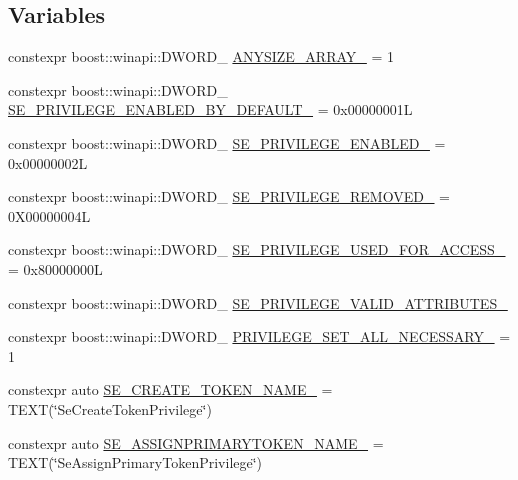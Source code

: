 \subsection*{Variables}
\begin{DoxyCompactItemize}
\item 
constexpr boost\+::winapi\+::\+D\+W\+O\+R\+D\+\_\+ \mbox{\hyperlink{namespaceboost_1_1winapi_a7c615455746a3e247ee2b7009dd0101c}{A\+N\+Y\+S\+I\+Z\+E\+\_\+\+A\+R\+R\+A\+Y\+\_\+}} = 1
\item 
constexpr boost\+::winapi\+::\+D\+W\+O\+R\+D\+\_\+ \mbox{\hyperlink{namespaceboost_1_1winapi_a6b5da96c8f385161dc17a99234cd8c7f}{S\+E\+\_\+\+P\+R\+I\+V\+I\+L\+E\+G\+E\+\_\+\+E\+N\+A\+B\+L\+E\+D\+\_\+\+B\+Y\+\_\+\+D\+E\+F\+A\+U\+L\+T\+\_\+}} = 0x00000001L
\item 
constexpr boost\+::winapi\+::\+D\+W\+O\+R\+D\+\_\+ \mbox{\hyperlink{namespaceboost_1_1winapi_a8691d65b7c61401a15be2dea40202334}{S\+E\+\_\+\+P\+R\+I\+V\+I\+L\+E\+G\+E\+\_\+\+E\+N\+A\+B\+L\+E\+D\+\_\+}} = 0x00000002L
\item 
constexpr boost\+::winapi\+::\+D\+W\+O\+R\+D\+\_\+ \mbox{\hyperlink{namespaceboost_1_1winapi_a90fdf769b75dfe0481c21acde1080f73}{S\+E\+\_\+\+P\+R\+I\+V\+I\+L\+E\+G\+E\+\_\+\+R\+E\+M\+O\+V\+E\+D\+\_\+}} = 0\+X00000004L
\item 
constexpr boost\+::winapi\+::\+D\+W\+O\+R\+D\+\_\+ \mbox{\hyperlink{namespaceboost_1_1winapi_a048b4f29ba154f8b36f3c942b8977da6}{S\+E\+\_\+\+P\+R\+I\+V\+I\+L\+E\+G\+E\+\_\+\+U\+S\+E\+D\+\_\+\+F\+O\+R\+\_\+\+A\+C\+C\+E\+S\+S\+\_\+}} = 0x80000000L
\item 
constexpr boost\+::winapi\+::\+D\+W\+O\+R\+D\+\_\+ \mbox{\hyperlink{namespaceboost_1_1winapi_ab891d5a501298e986f1dbd891f3b1fe2}{S\+E\+\_\+\+P\+R\+I\+V\+I\+L\+E\+G\+E\+\_\+\+V\+A\+L\+I\+D\+\_\+\+A\+T\+T\+R\+I\+B\+U\+T\+E\+S\+\_\+}}
\item 
constexpr boost\+::winapi\+::\+D\+W\+O\+R\+D\+\_\+ \mbox{\hyperlink{namespaceboost_1_1winapi_aad5c7016b79379871b16c20eb3af3579}{P\+R\+I\+V\+I\+L\+E\+G\+E\+\_\+\+S\+E\+T\+\_\+\+A\+L\+L\+\_\+\+N\+E\+C\+E\+S\+S\+A\+R\+Y\+\_\+}} = 1
\item 
constexpr auto \mbox{\hyperlink{namespaceboost_1_1winapi_ad8f53b422f0b245e13d081fe58ab9534}{S\+E\+\_\+\+C\+R\+E\+A\+T\+E\+\_\+\+T\+O\+K\+E\+N\+\_\+\+N\+A\+M\+E\+\_\+}} = T\+E\+XT(\char`\"{}Se\+Create\+Token\+Privilege\char`\"{})
\item 
constexpr auto \mbox{\hyperlink{namespaceboost_1_1winapi_afe48801f5eea017990b6f74ece34dee4}{S\+E\+\_\+\+A\+S\+S\+I\+G\+N\+P\+R\+I\+M\+A\+R\+Y\+T\+O\+K\+E\+N\+\_\+\+N\+A\+M\+E\+\_\+}} = T\+E\+XT(\char`\"{}Se\+Assign\+Primary\+Token\+Privilege\char`\"{})

\end{DoxyCompactItemize}
